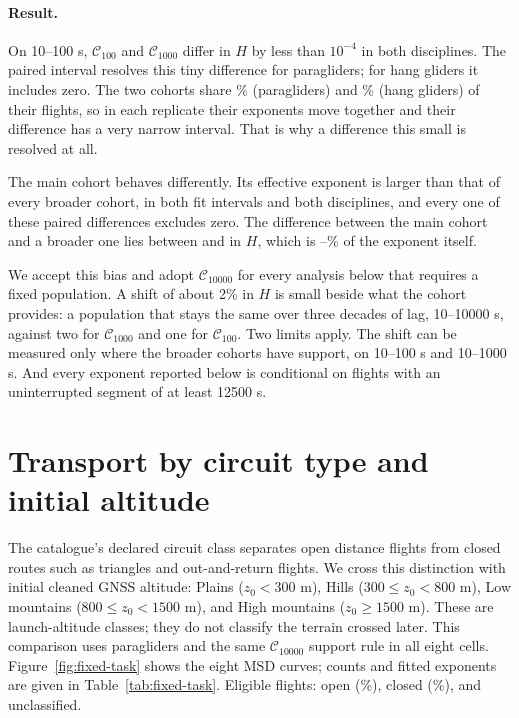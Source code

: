 \paragraph{Result.}
On 10--100 s, $\mathcal C_{100}$ and $\mathcal C_{1000}$ differ in $H$ by less than
$10^{-4}$ in both disciplines. The paired interval resolves this tiny difference for
paragliders; for hang gliders it includes zero. The two cohorts share
\ChThreeParaCohortOverlapPct\% (paragliders) and \ChThreeHangCohortOverlapPct\% (hang
gliders) of their flights, so in each replicate their exponents move together and
their difference has a very narrow interval. That is why a difference this small is
resolved at all.

The main cohort behaves differently. Its effective exponent is larger than that of
every broader cohort, in both fit intervals and both disciplines, and every one of
these paired differences excludes zero. The difference between the main cohort and a
broader one lies between \ChThreeCohortShiftMin{} and \ChThreeCohortShiftMax{} in $H$,
which is \ChThreeCohortBiasMinPct--\ChThreeCohortBiasMaxPct\% of the exponent itself.

We accept this bias and adopt $\mathcal C_{10000}$ for every analysis below that
requires a fixed population. A shift of about 2\% in $H$ is small beside what the cohort
provides: a population that stays the same over three decades of lag, 10--10000 s,
against two for $\mathcal C_{1000}$ and one for $\mathcal C_{100}$. Two limits apply. The shift can be measured only
where the broader cohorts have support, on 10--100 s and 10--1000 s. And every exponent reported below is
conditional on flights with an uninterrupted segment of at least 12500 s.

\FloatBarrier

\section{Transport by circuit type and initial altitude}
\label{sec:fixed-circuit}

The catalogue's declared circuit class separates open distance flights from closed
routes such as triangles and out-and-return flights. We cross this distinction with
initial cleaned GNSS altitude: Plains ($z_0<300$ m), Hills ($300\leq z_0<800$ m),
Low mountains ($800\leq z_0<1500$ m), and High mountains ($z_0\geq1500$ m).
These are launch-altitude classes; they do not classify the terrain crossed later.
This comparison uses paragliders and the same $\mathcal C_{10000}$ support rule in
all eight cells. Figure~\ref{fig:fixed-task} shows the eight MSD curves; counts and
fitted exponents are given in Table~\ref{tab:fixed-task}.
Eligible flights: \ChThreeEligibleOpen{} open (\ChThreeEligibleOpenPct\%),
\ChThreeEligibleClosed{} closed (\ChThreeEligibleClosedPct\%), and
\ChThreeEligibleUnknown{} unclassified.

